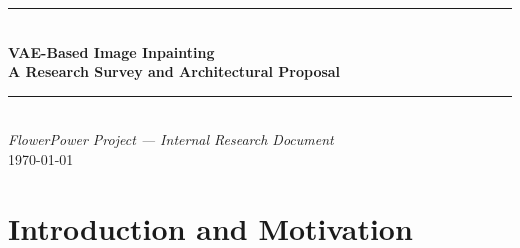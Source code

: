 \documentclass[11pt, a4paper]{article}
\begin{document}
\begin{center}
  {\color{secblue}\rule{\textwidth}{1.2pt}}\\[0.8em]
  {\LARGE\bfseries\color{secblue} VAE-Based Image Inpainting}\\[0.3em]
  {\LARGE\bfseries\color{secblue} A Research Survey and Architectural Proposal}\\[0.6em]
  {\color{secblue}\rule{\textwidth}{1.2pt}}\\[1.2em]
  {\large\textit{FlowerPower Project --- Internal Research Document}}\\[0.5em]
  {\normalsize\today}
\end{center}

\vspace{1.5em}

\begin{abstract}
\noindent
The FlowerPower project currently compares two generative approaches for image inpainting on 128\(\times\)128 flower images: a custom U-Net GAN trained from scratch and a fine-tuned LaMa (Large Mask Inpainting) model based on Fast Fourier Convolutions. This document investigates the feasibility of introducing a Variational Autoencoder (VAE) based paradigm to the comparison. We organise our findings into two categories: (i)~\textbf{inference-ready models} with pre-trained weights that can be applied directly to the flower images without architectural changes or full retraining, and (ii)~\textbf{models requiring retraining} that need architectural adaptation or training from scratch. For the inference-ready category, we identify the Diverse Structure Inpainting model (hierarchical VQ-VAE) and the ICT/PUT transformer-based approaches with VQ-VAE tokenisers. (Note: Stable Diffusion was considered but dropped due to prohibitive inference times on CPU hardware). For the retraining category, we survey VAEAC, propose a custom convolutional VAE--GAN hybrid, and discuss training strategies including KL annealing and adversarial sharpening.
\end{abstract}

\tableofcontents
\newpage

\section{Introduction and Motivation}
\end{document}
